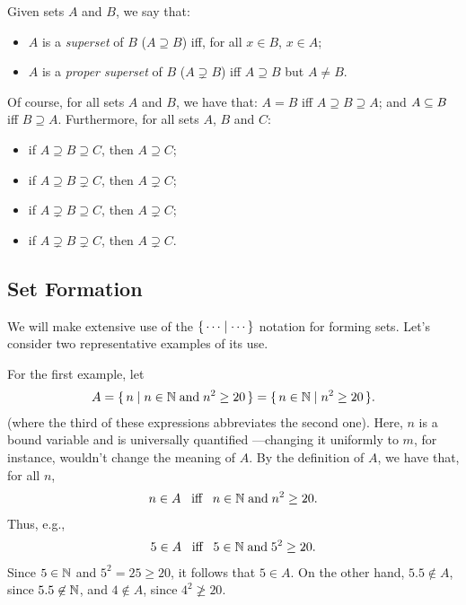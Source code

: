 Given sets $A$ and $B$, we say that:
\begin{itemize}
\item $A$ is a \emph{superset}
%
%
of $B$ ($A\supseteq B$)
%
%
iff, for all $x\in B$, $x\in A$;

\item $A$ is a
\emph{proper superset}
%
%
%
of $B$ ($A\supsetneq B$)
%
%
iff $A\supseteq B$ but $A\neq B$.
\end{itemize}
Of course, for all sets $A$ and $B$, we have that:
$A=B$ iff $A\supseteq B\supseteq A$; and $A\subseteq B$ iff $B\supseteq A$.
Furthermore, for all sets $A$, $B$ and $C$:
\begin{itemize}
\item if $A\supseteq B\supseteq C$, then $A\supseteq C$;

\item if $A\supseteq B\supsetneq C$, then $A\supsetneq C$;

\item if $A\supsetneq B\supseteq C$, then $A\supsetneq C$;

\item if $A\supsetneq B\supsetneq C$, then $A\supsetneq C$.
\end{itemize}

\subsection{Set Formation}

We will make extensive use of the $\{ \, \cdots \mid \cdots \, \}$ notation
for forming sets.
%
%
%
%
Let's consider two representative examples of its use.

For the first example, let
\begin{gather*}
A=\{ \, n \mid n\in\mathbb{N}\;\allowbreak\mbox{and}\allowbreak\;n^2\geq 20 \, \}
 =\{ \, n\in\mathbb{N} \mid n^2\geq 20 \, \}.
\end{gather*}
(where the third of these expressions abbreviates the second one).
Here, $n$ is a bound variable
%
and is universally quantified%
%
%
---changing it uniformly to $m$, for instance, wouldn't change the
meaning of $A$.  By the definition of $A$, we have that, for all $n$,
\begin{gather*}
n\in A\mathrel{\;\;\allowbreak\mbox{iff}\allowbreak\;\;} n\in\mathbb{N}\;\allowbreak\mbox{and}\allowbreak\;n^2\geq 20.
\end{gather*}
Thus, e.g.,
\begin{gather*}
5\in A\mathrel{\;\;\allowbreak\mbox{iff}\allowbreak\;\;} 5\in\mathbb{N}\;\allowbreak\mbox{and}\allowbreak\;5^2\geq 20 .
\end{gather*}
Since $5\in\mathbb{N}$ and $5^2=25\geq 20$, it follows that $5\in A$.  On
the other hand, $5.5\not\in A$, since $5.5\not\in\mathbb{N}$, and $4\not\in A$,
since $4^2\not\geq 20$.

